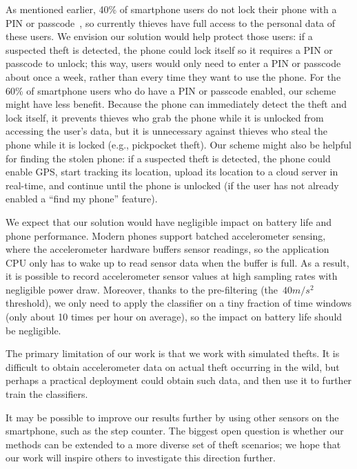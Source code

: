 As mentioned earlier, 40\% of smartphone users do not lock their phone with a PIN or passcode~\cite{egelman:lock,Harbach2016b}, so currently thieves have full access to the personal data of these users.
We envision our solution would help protect those users: if a suspected theft is detected, the phone could lock itself so it requires a PIN or passcode to unlock; this way, users would only need to enter a PIN or passcode about once a week, rather than every time they want to use the phone.
For the 60\% of smartphone users who do have a PIN or passcode enabled, our scheme might have less benefit.
Because the phone can immediately detect the theft and lock itself, it prevents thieves who grab the phone while it is unlocked from accessing the user's data, but it is unnecessary against thieves who steal the phone while it is locked (e.g., pickpocket theft).
Our scheme might also be helpful for finding the stolen phone: if a suspected theft is detected, the phone could enable GPS, start tracking its location, upload its location to a cloud server in real-time, and continue until the phone is unlocked (if the user has not already enabled a ``find my phone'' feature).

We expect that our solution would have negligible impact on battery life and phone performance.
Modern phones support batched accelerometer sensing, where the accelerometer hardware buffers sensor readings, so the application CPU only has to wake up to read sensor data when the buffer is full.
As a result, it is possible to record accelerometer sensor values at high sampling rates with negligible power draw.
Moreover, thanks to the pre-filtering (the~$40 m/s^2$ threshold),
we only need to apply the classifier on a tiny fraction of time windows (only about 10 times per hour on average),
so the impact on battery life should be negligible.

The primary limitation of our work is that we work with simulated thefts.
It is difficult to obtain accelerometer data on actual theft occurring in the wild, but perhaps a practical deployment could obtain such data, and then use it to further train the classifiers.

It may be possible to improve our results further by using other sensors on the smartphone, such as the step counter.
The biggest open question is whether our methods can be extended to a more diverse set of theft scenarios; we hope that our work will inspire others to investigate this direction further.




